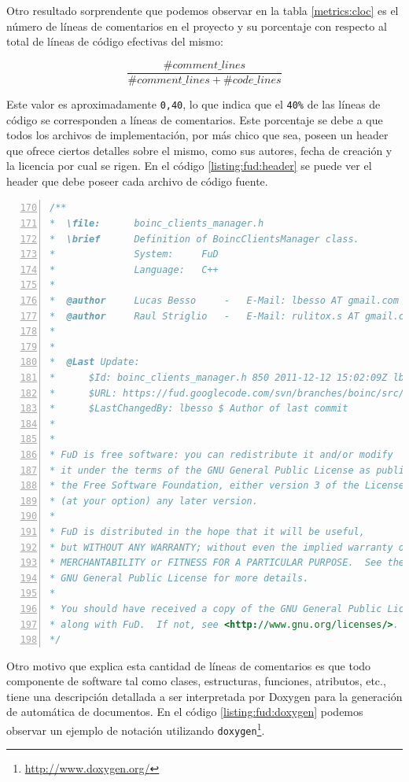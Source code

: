 Otro resultado sorprendente que podemos observar en la tabla \ref{metrics:cloc} es el número de líneas de comentarios en el proyecto y su porcentaje con respecto al total de líneas de código efectivas del mismo:

$$\frac{\#comment\_lines}{\#comment\_lines + \#code\_lines}$$

Este valor es aproximadamente \texttt{0,40}, lo que indica que el \texttt{40\%} de las líneas de código se corresponden a líneas de comentarios. Este porcentaje se debe a que todos los archivos de implementación, por más chico que sea, poseen un header que ofrece ciertos detalles sobre el mismo, como sus autores, fecha de creación y la licencia por cual se rigen. En el código \ref{listing:fud:header} se puede ver el header que debe poseer cada archivo de código fuente.


\begin{lstlisting}[frame=shadowbox, language=C++, numbers=left, xleftmargin=8mm, framexleftmargin=22pt, basicstyle=\scriptsize, numberstyle=\footnotesize, breaklines=true, breakatwhitespace=false, caption={Header común en los archivos de implementación}, label=listing:fud:header, backgroundcolor=\color{gris}, firstnumber=170, tabsize=4, keywordstyle=\color{Blue}]
/**
*  \file:      boinc_clients_manager.h
*  \brief      Definition of BoincClientsManager class.
*              System:     FuD
*              Language:   C++
*
*  @author     Lucas Besso     -   E-Mail: lbesso AT gmail.com
*  @author     Raul Striglio   -   E-Mail: rulitox.s AT gmail.com
*
*
*  @Last Update:
*      $Id: boinc_clients_manager.h 850 2011-12-12 15:02:09Z lbesso $
*      $URL: https://fud.googlecode.com/svn/branches/boinc/src/middlewares/boinc/server/boinc_clients_manager.h $
*      $LastChangedBy: lbesso $ Author of last commit
*
*
* FuD is free software: you can redistribute it and/or modify
* it under the terms of the GNU General Public License as published by
* the Free Software Foundation, either version 3 of the License, or
* (at your option) any later version.
*
* FuD is distributed in the hope that it will be useful,
* but WITHOUT ANY WARRANTY; without even the implied warranty of
* MERCHANTABILITY or FITNESS FOR A PARTICULAR PURPOSE.  See the
* GNU General Public License for more details.
*
* You should have received a copy of the GNU General Public License
* along with FuD.  If not, see <http://www.gnu.org/licenses/>.
*/
\end{lstlisting}

Otro motivo que explica esta cantidad de líneas de comentarios es que todo componente de software tal como clases, estructuras, funciones, atributos, etc., tiene una descripción detallada a ser interpretada por Doxygen para la generación de automática de documentos. En el código \ref{listing:fud:doxygen} podemos observar un ejemplo de notación utilizando \texttt{doxygen}\footnote{\url{http://www.doxygen.org/}}.

